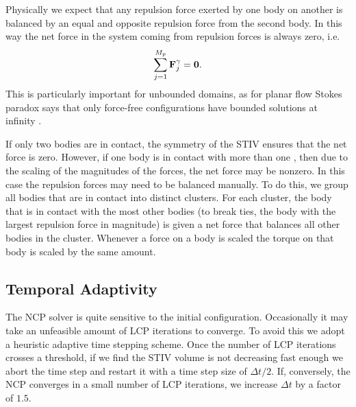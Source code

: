 \documentclass[preprint, 10pt]{elsarticle}
\begin{document}
Physically we expect that any repulsion force exerted by one body on
another is balanced by an equal and opposite repulsion force from the
second body.  In this way the net force in the system coming from
repulsion forces is always zero, i.e.
\begin{equation*}
	\sum\limits_{j=1}^{M_p} {\mathbf{F}}^\gamma_j = \mathbf{0}.
\end{equation*}
This is particularly important for unbounded domains, as for planar flow Stokes
paradox says that only force-free configurations have bounded solutions at
infinity \cite{Power1993, Pozrikidis1992}.

If only two bodies are in contact, the symmetry of the STIV ensures that the
net force is zero. However, if one body is in contact with more than one
, then due to the scaling of the magnitudes of the forces, the net force may be nonzero. In
this case the repulsion forces may need to be balanced manually. To do
this, we group all bodies 
that are in contact into distinct clusters.
For each cluster, the body that is in contact with the most other bodies
(to break ties, the body  with the largest repulsion force in magnitude) is
given a net force that balances all other bodies in the
cluster. Whenever a force on a body is scaled the torque on that
body is scaled by the same amount.

\subsection{Temporal Adaptivity}

The NCP solver is quite sensitive to the initial configuration.
Occasionally it may take an unfeasible amount of LCP iterations to
converge. To avoid this we adopt a heuristic adaptive time stepping
scheme. Once the number of LCP iterations crosses a threshold, if we
find the STIV volume is not decreasing fast enough we abort the time
step and restart it with a time step size of $\Delta t/2$. If, conversely, the NCP
converges in a small number of LCP iterations, we increase $\Delta t$
by a factor of $1.5$.
\end{document}
